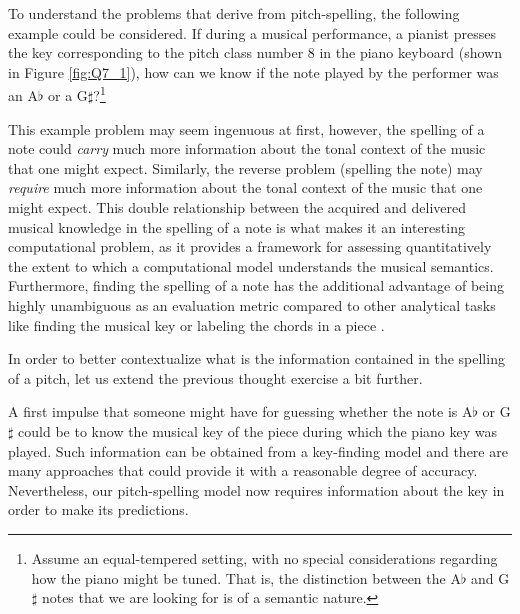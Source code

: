 

To understand the problems that derive from
pitch-spelling, the following example could be considered.
If during a musical performance, a pianist presses the key
corresponding to the pitch class number 8 in the piano
keyboard (shown in Figure  \ref{fig:Q7_1}), how can we
know if the note played by the performer was an A$\flat$
or a G$\sharp$?\footnote{Assume an equal-tempered setting,
with no special considerations regarding how the piano
might be tuned. That is, the distinction between the
A$\flat$ and G$\sharp$ notes that we are looking for is of
a semantic nature.}


This example problem may seem ingenuous at first, however,
the spelling of a note could \emph{carry} much more
information about the tonal context of the music that one
might expect. Similarly, the reverse problem (spelling the
note) may \emph{require} much more information about the
tonal context of the music that one might expect. This
double relationship between the acquired and delivered
musical knowledge in the spelling of a note is what makes
it an interesting computational problem, as it provides a
framework for assessing quantitatively the extent to which
a computational model understands the musical semantics.
Furthermore, finding the spelling of a note has the
additional advantage of being highly unambiguous as an
evaluation metric compared to other analytical tasks like
finding the musical key \parencite{gebhardt2018confidence}
or labeling the chords in a piece
\parencite{ni2013understanding}.

In order to better contextualize what is the information
contained in the spelling of a pitch, let us extend the
previous thought exercise a bit further.

A first impulse that someone might have for guessing
whether the note is A$\flat$ or G$\sharp$ could be to know
the musical key of the piece during which the piano key
was played. Such information can be obtained from a
key-finding model and there are many approaches that could
provide it with a reasonable degree of accuracy.
Nevertheless, our pitch-spelling model now requires
information about the key in order to make its
predictions.

